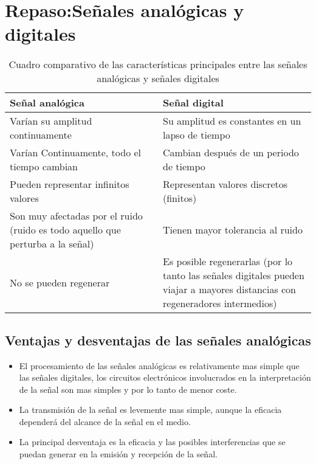 \documentclass[11pt,fleqn]{book} %
\begin{document}
\section{Repaso:Señales analógicas y digitales}
\begin{table}[ht]
\centering
\begin{tabular}{|m{0.5\linewidth}|m{0.5\linewidth}|}
\toprule
\textbf{Señal analógica} & \textbf{Señal digital}\\
\midrule
Varían su amplitud continuamente & Su amplitud es constantes en un lapso de tiempo\\ \hline
Varían Continuamente, todo el tiempo cambian & Cambian después de un periodo de tiempo\\ \hline
Pueden representar infinitos valores & Representan valores discretos (finitos)\\ \hline
Son muy afectadas por el ruido (ruido es todo aquello que perturba a la señal) & Tienen mayor tolerancia al ruido\\ \hline
No se pueden regenerar & Es posible regenerarlas (por lo tanto las señales digitales pueden viajar  a mayores distancias con regeneradores intermedios)\\
\bottomrule
\end{tabular}
\caption{Cuadro comparativo de las características principales entre las señales analógicas y señales digitales}
\label{tab:analogvsdig} 
\end{table}
\subsection{Ventajas y desventajas de las señales analógicas}
\begin{itemize}
\item El procesamiento de las señales analógicas es relativamente mas simple que las señales digitales, los circuitos electrónicos involucrados en la interpretación de la señal son mas simples y por lo tanto de menor coste.
\item La transmisión de la señal es levemente mas simple, aunque la eficacia dependerá del alcance de la señal en el medio.
\item La principal desventaja es la eficacia  y las posibles interferencias que se puedan generar en la emisión y recepción de la señal.
\end{itemize}
\end{document}
